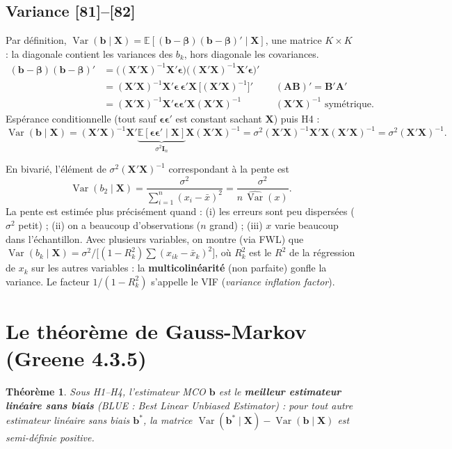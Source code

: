 \documentclass[11pt,a4paper]{article}
\newcommand{\vX}{\mathbf{X}}
\newcommand{\vb}{\mathbf{b}}
\newcommand{\vbeta}{\bm{\beta}}
\newcommand{\veps}{\bm{\epsilon}}
\newcommand{\I}{\mathbf{I}}
\newcommand{\A}{\mathbf{A}}
\newcommand{\XtX}{\vX'\vX}
\newcommand{\XtXi}{(\vX'\vX)^{-1}}
\newcommand{\E}{\mathbb{E}}
\newcommand{\Var}{\operatorname{Var}}
\newcommand{\sumi}{\sum_{i=1}^{n}}
\newtheorem*{theoreme}{Théorème}
\begin{document}
\subsection{Variance [81]--[82]}
\begin{detail}
Par définition, $\Var(\vb\mid\vX)=\E[(\vb-\vbeta)(\vb-\vbeta)'\mid\vX]$, une matrice $K\times K$ : la diagonale contient les variances des $b_k$, hors diagonale les covariances.
\begin{align*}
(\vb-\vbeta)(\vb-\vbeta)'&=\big(\XtXi\vX'\veps\big)\big(\XtXi\vX'\veps\big)'\\
&=\XtXi\vX'\veps\,\veps'\vX\,\big[\XtXi\big]' &&(\A\mathbf{B})'=\mathbf{B}'\A'\\
&=\XtXi\vX'\veps\veps'\vX\XtXi &&\XtXi\text{ symétrique}.
\end{align*}
Espérance conditionnelle (tout sauf $\veps\veps'$ est constant sachant $\vX$) puis H4 :
\[
\Var(\vb\mid\vX)=\XtXi\vX'\underbrace{\E[\veps\veps'\mid\vX]}_{\sigma^2\I_n}\vX\XtXi=\sigma^2\XtXi\XtX\XtXi=\sigma^2\XtXi .
\]
\end{detail}

\begin{exemple}[title={Cas bivarié : ce qui rend un estimateur précis}]
En bivarié, l'élément de $\sigma^2\XtXi$ correspondant à la pente est
\[
\Var(b_2\mid\vX)=\frac{\sigma^2}{\sumi(x_i-\bar x)^2}=\frac{\sigma^2}{n\,\widehat{\Var}(x)} .
\]
La pente est estimée plus précisément quand : (i) les erreurs sont peu dispersées ($\sigma^2$ petit) ; (ii) on a beaucoup d'observations ($n$ grand) ; (iii) $x$ varie beaucoup dans l'échantillon. Avec plusieurs variables, on montre (via FWL) que $\Var(b_k\mid\vX)=\sigma^2/\big[(1-R_k^2)\sum(x_{ik}-\bar x_k)^2\big]$, où $R_k^2$ est le $R^2$ de la régression de $x_k$ sur les autres variables : la \textbf{multicolinéarité} (non parfaite) gonfle la variance. Le facteur $1/(1-R_k^2)$ s'appelle le VIF (\emph{variance inflation factor}).
\end{exemple}

\section{Le théorème de Gauss-Markov (Greene 4.3.5)}

\begin{theoreme}
Sous H1--H4, l'estimateur MCO $\vb$ est le \textbf{meilleur estimateur linéaire sans biais} (BLUE : \emph{Best Linear Unbiased Estimator}) : pour tout autre estimateur linéaire sans biais $\vb^*$, la matrice $\Var(\vb^*\mid\vX)-\Var(\vb\mid\vX)$ est semi-définie positive.
\end{theoreme}
\end{document}

